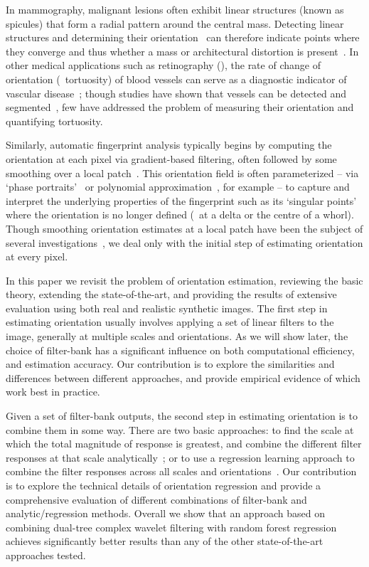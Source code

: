 In mammography, malignant lesions often exhibit linear structures (known as spicules) that form a radial pattern around the central mass. Detecting linear structures and determining their orientation~\cite{Zwiggelaar_etal_MIA99,Zwiggelaar_etal_TMI04} can therefore indicate points where they converge and thus whether a mass or architectural distortion is present~\cite{Karssemeijer_teBrake_TMI96,Rangayyan_Ayres_MBEC06}. In other medical applications such as retinography (), the rate of change of orientation (\ie~tortuosity) of blood vessels can serve as a diagnostic indicator of vascular disease~\cite{Hart_etal_IJMI99}; though studies have shown that vessels can be detected and segmented~\cite{Staal_etal_TMI04,Ricci_Perfetti_TMI07,Dabbah_etal_MICCAI10}, few have addressed the problem of measuring their orientation and quantifying tortuosity.

Similarly, automatic fingerprint analysis typically begins by computing the orientation at each pixel via gradient-based filtering, often followed by some smoothing over a local patch~\cite{Bazen_Gerez_TPAMI02,Mei_etal_IVC09}. This orientation field is often parameterized -- via `phase portraits'~\cite{Li_etal_PR06} or polynomial approximation~\cite{Gu_etal_PR04}, for example -- to capture and interpret the underlying properties of the fingerprint such as its `singular points' where the orientation is no longer defined (\eg~at a delta or the centre of a whorl). Though smoothing orientation estimates at a local patch have been the subject of several investigations~\cite{Kass_Witkin_CVGIP87,Rao_Jain_TPAMI92,Perona_TIP98}, we deal only with the initial step of estimating orientation at every pixel.

In this paper we revisit the problem of orientation estimation, reviewing the basic theory, extending the state-of-the-art, and providing the results of extensive evaluation using both real and realistic synthetic images. The first step in estimating orientation usually involves applying a set of linear filters to the image, generally at multiple scales and orientations. As we will show later, the choice of filter-bank has a significant influence on both computational efficiency, and estimation accuracy. Our contribution is to explore the similarities and differences between different approaches, and provide empirical evidence of which work best in practice.

Given a set of filter-bank outputs, the second step in estimating orientation is to combine them in some way. There are two basic approaches: to find the scale at which the total magnitude of response is greatest, and combine the different filter responses at that scale analytically~\cite{Karssemeijer_teBrake_TMI96,Mei_etal_IVC09}; or to use a regression learning approach to combine the filter responses across all scales and orientations~\cite{Berks_etal_IPMI11}. Our contribution is to explore the technical details of orientation regression and provide a comprehensive evaluation of different combinations of filter-bank and analytic/regression methods. Overall we show that an approach based on combining dual-tree complex wavelet filtering with random forest regression achieves significantly better results than any of the other state-of-the-art approaches tested.

